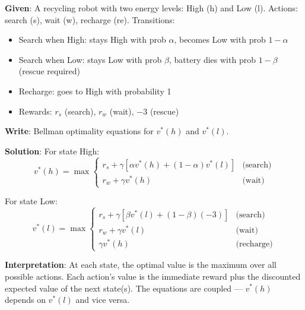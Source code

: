 \documentclass[11pt,a4paper]{article}
\begin{document}
\begin{tcolorbox}[colback=blue!5!white,colframe=blue!75!black,title=\textbf{Worked Example 22: Bellman Equation -- Recycling Robot}]
\textbf{Given}: A recycling robot with two energy levels: High (h) and Low (l). Actions: search (s), wait (w), recharge (re). Transitions:
\begin{itemize}
    \item Search when High: stays High with prob $\alpha$, becomes Low with prob $1-\alpha$
    \item Search when Low: stays Low with prob $\beta$, battery dies with prob $1-\beta$ (rescue required)
    \item Recharge: goes to High with probability 1
    \item Rewards: $r_s$ (search), $r_w$ (wait), $-3$ (rescue)
\end{itemize}

\textbf{Write}: Bellman optimality equations for $v^*(h)$ and $v^*(l)$.

\textbf{Solution}:
For state High:
\[
v^*(h) = \max \begin{cases}
r_s + \gamma[\alpha v^*(h) + (1-\alpha)v^*(l)] & \text{(search)} \\
r_w + \gamma v^*(h) & \text{(wait)}
\end{cases}
\]

For state Low:
\[
v^*(l) = \max \begin{cases}
r_s + \gamma[\beta v^*(l) + (1-\beta)(-3)] & \text{(search)} \\
r_w + \gamma v^*(l) & \text{(wait)} \\
\gamma v^*(h) & \text{(recharge)}
\end{cases}
\]

\textbf{Interpretation}: At each state, the optimal value is the maximum over all possible actions. Each action's value is the immediate reward plus the discounted expected value of the next state(s). The equations are coupled --- $v^*(h)$ depends on $v^*(l)$ and vice versa.
\end{tcolorbox}
\end{document}
